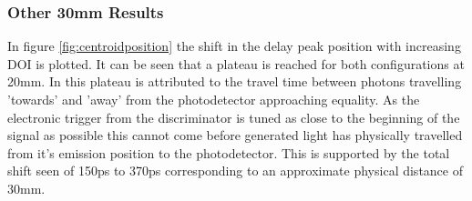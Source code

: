 \subsubsection{Other 30mm Results}
In figure \ref{fig:centroidposition} the shift in the delay peak position with increasing DOI is plotted. It can be seen that a plateau is reached for both configurations at 20mm. In \cite{Moses_Derenzo_1999} this plateau is attributed to the travel time between photons travelling 'towards' and 'away' from the photodetector approaching equality. As the electronic trigger from the discriminator is tuned as close to the beginning of the signal as possible this cannot come before generated light has physically travelled from it's emission position to the photodetector. This is supported by the total shift seen of 150ps to 370ps corresponding to an approximate physical distance of 30mm.
